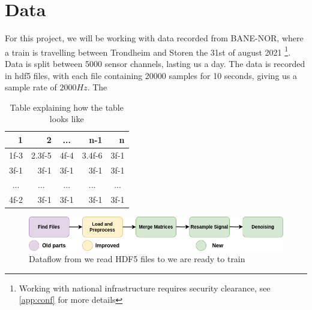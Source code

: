 \section{Data}

For this project, we will be working with data recorded from BANE-NOR, where a train is travelling between Trondheim and Storen the 31st of august 2021 \footnote{Working with national infrastructure requires security clearance, see \ref{app:conf} for more details}. Data is split between 5000 sensor channels, lasting us a day.
The data is recorded in \acrshort{hdf5} files, with each file containing 20000 samples for 10 seconds, giving us a sample rate of $2000Hz$. The


\begin{table}[h]
\centering
\begin{tabular}{|r|r|r|r|r|}
\hline
\textbf{1}                & \textbf{2}               & \multicolumn{1}{c|}{\textbf{...}} & \textbf{n-1}             & \textbf{n}               \\ \hline
1f-3                      & 2.3f-5                   & 4f-4                              & 3.4f-6                   & 3f-1                     \\ \hline
3f-1                      & 3f-1                     & 3f-1                              & 3f-1                     & 3f-1                     \\ \hline
\multicolumn{1}{|c|}{...} & \multicolumn{1}{c|}{...} & \multicolumn{1}{c|}{...}          & \multicolumn{1}{c|}{...} & \multicolumn{1}{c|}{...} \\ \hline
4f-2                      & 3f-1                     & 3f-1                              & 3f-1                     & 3f-1                     \\ \hline
\end{tabular}
\caption{Table explaining how the table looks like}
\label{fig:datatable}
\end{table}



\begin{figure}[h]
    \centering
    \includegraphics{figures/dataflow.png}
    \caption{Dataflow from we read HDF5 files to we are ready to train}
    \label{fig:dataflow}
\end{figure}

